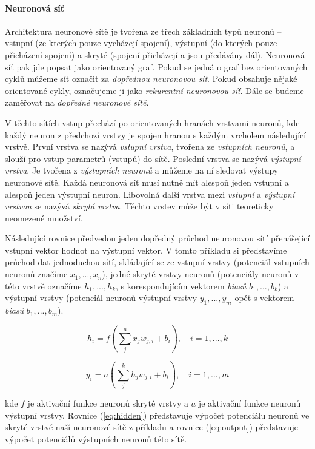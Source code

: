\paragraph{Neuronová síť}
Architektura neuronové sítě je tvořena ze třech základních typů neuronů --
vstupní (ze kterých pouze vycházejí spojení), výstupní (do kterých pouze
přicházení spojení) a skryté (spojení přicházejí a jsou předávány dál).
Neuronová síť pak jde popsat jako orientovaný graf. Pokud se jedná o graf bez
orientovaných cyklů můžeme síť označit za \emph{dopřednou neuronovou síť}.
Pokud obsahuje nějaké orientované cykly, označujeme ji jako \emph{rekurentní
neuronovou síť}. Dále se budeme zaměřovat na \emph{dopředné neuronové sítě}.

V těchto sítích vstup přechází po orientovaných hranách vrstvami neuronů, kde
každý neuron z předchozí vrstvy je spojen hranou s každým vrcholem následující
vrstvě. První vrstva se nazývá \emph{vstupní vrstva}, tvořena ze
\emph{vstupních neuronů}, a slouží pro vstup parametrů (vstupů) do sítě.
Poslední vrstva se nazývá \emph{výstupní vrstva}. Je tvořena z \emph{výstupních
neuronů} a můžeme na ní sledovat výstupy neuronové sítě. Každá
neuronová síť musí nutně mít alespoň jeden vstupní a alespoň jeden výstupní
neuron. Libovolná další vrstva mezi \emph{vstupní} a \emph{výstupní vrstvou} se
nazývá \emph{skrytá vrstva}. Těchto vrstev může být v síti teoreticky neomezené
množství.

Následující rovnice předvedou jeden dopředný průchod neuronovou sítí
přenášející vstupní vektor hodnot na výstupní vektor. V tomto příkladu si
představíme průchod dat jednoduchou sítí, skládající se ze vstupní vrstvy
(potenciál vstupních neuronů značíme $x_1,...,x_n$), jedné skryté vrstvy
neuronů (potenciály neuronů v této vrstvě označíme $h_1,...,h_k$, s
korespondujícím vektorem \emph{biasů} $b_1,...,b_k$) a výstupní vrstvy
(potenciál neuronů výstupní vrstvy $y_1,...,y_m$ opět s vektorem \emph{biasů}
$b_1,...,b_m$).

\begin{equation} \label{eq:hidden}
    h_i = f(\sum_{j}^{n} x_j w_{j,i} + b_i), \quad i = 1,...,k
\end{equation}

\begin{equation} \label{eq:output}
    y_i = a(\sum_{j}^{k} h_j w_{j,i} + b_i), \quad i = 1,...,m
\end{equation}

kde $f$ je aktivační funkce neuronů skryté vrstvy a $a$ je aktivační funkce
neuronů výstupní vrstvy. Rovnice (\ref{eq:hidden}) představuje výpočet potenciálu
neuronů ve skryté vrstvě naší neuronové sítě z příkladu a rovnice
(\ref{eq:output}) představuje výpočet potenciálů výstupních neuronů této sítě.


